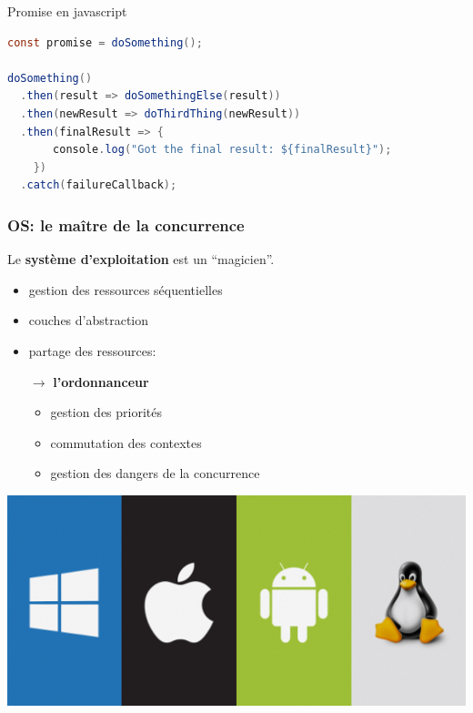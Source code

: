 \documentclass{beamer}
\begin{document}
\begin{frame}[fragile]{Promise en javascript}
  \begin{lstlisting}[language=java]
const promise = doSomething();

doSomething()
  .then(result => doSomethingElse(result))
  .then(newResult => doThirdThing(newResult))
  .then(finalResult => {
       console.log("Got the final result: ${finalResult}");
    })
  .catch(failureCallback);
  \end{lstlisting}
\end{frame}
\begin{frame}
  \frametitle{OS: le maître de la concurrence}
  Le \textbf{système d'exploitation} est un ``magicien''.
  \par\bigskip
  \begin{minipage}{.55\textwidth}
    \begin{itemize}
    \item gestion des ressources séquentielles
    \item couches d'abstraction
    \item partage des ressources:\par
      $\rightarrow$ \textbf{l'ordonnanceur}
      \begin{itemize}
      \item gestion des priorités
      \item commutation des contextes
      \item<2-> gestion des dangers de la concurrence
      \end{itemize}
    \end{itemize}
  \end{minipage}
  \begin{minipage}{.44\textwidth}
    \begin{center}
      \includegraphics[width=.7\textwidth]{os.png}
    \end{center}
  \end{minipage}
\end{frame} %
\end{document}
